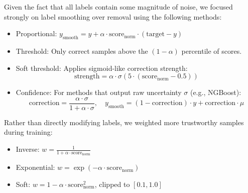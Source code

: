 
Given the fact that all labels contain some magnitude of noise, we focused strongly on label smoothing over removal using the following methods:

\begin{itemize}
    \item Proportional: $y_{\text{smooth}} = y + \alpha \cdot \text{score}_{\text{norm}} \cdot (\text{target} - y)$
    
    \item Threshold: Only correct samples above the $(1-\alpha)$ percentile of scores.
    
    \item Soft threshold: Applies sigmoid-like correction strength:
    $$\text{strength} = \alpha \cdot \sigma\left(5 \cdot (\text{score}_{\text{norm}} - 0.5)\right)$$
    
    \item Confidence: For methods that output raw uncertainty $\sigma$ (e.g., NGBoost):
    $$\text{correction} = \frac{\alpha \cdot \sigma}{1 + \alpha \cdot \sigma}, \quad y_{\text{smooth}} = (1 - \text{correction}) \cdot y + \text{correction} \cdot \mu$$
\end{itemize}


Rather than directly modifying labels, we weighted more trustworthy samples during training:

\begin{itemize}
    \item Inverse: $w = \frac{1}{1 + \alpha \cdot \text{score}_{\text{norm}}}$
    
    \item Exponential: $w = \exp(-\alpha \cdot \text{score}_{\text{norm}})$
    
    \item Soft: $w = 1 - \alpha \cdot \text{score}_{\text{norm}}^2$, clipped to $[0.1, 1.0]$
\end{itemize}

